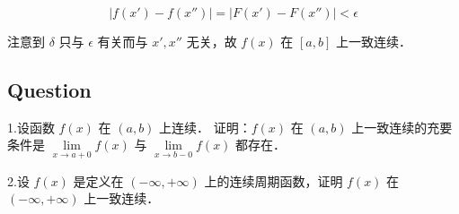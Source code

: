 $$
\vert f(x')-f(x'')\vert=\vert F(x')-F(x'')\vert<\epsilon
$$

注意到 $\delta$ 只与 $\epsilon$ 有关而与 $x',x''$ 无关，故 $f(x)$ 在 $[a,b]$ 上一致连续．

\subsection{Question}

1.设函数 $f(x)$ 在 $(a,b)$ 上连续． 证明：$f(x)$ 在 $(a,b)$ 上一致连续的充要条件是 $\lim\limits_{x\rightarrow a+0}f(x)$ 与 $\lim\limits_{x\rightarrow b-0}f(x)$ 都存在．

2.设 $f(x)$ 是定义在 $(-\infty,+\infty)$ 上的连续周期函数，证明 $f(x)$ 在 $(-\infty,+\infty)$ 上一致连续．
